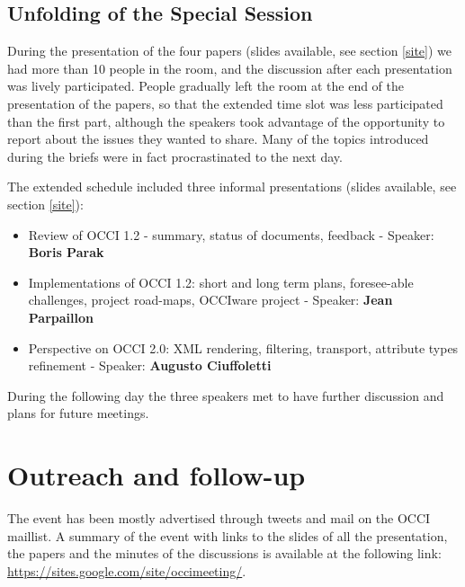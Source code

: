 \documentclass[10pt,a4paper]{article}
\begin{document}
\subsection{Unfolding of the Special Session}

During the presentation of the four papers (slides available, see section \ref{site}) we had more than 10 people in the room, and the discussion after each presentation was lively participated. People gradually left the room at the end of the presentation of the papers, so that the extended time slot was less participated than the first part, although the speakers took advantage of the opportunity to report about the issues they wanted to share. Many of the topics introduced during the briefs were in fact procrastinated to the next day.

The extended schedule included three informal presentations (slides available, see section \ref{site}):

\begin{itemize}
\item Review of OCCI 1.2 - summary, status of documents, feedback - Speaker: {\bf Boris Parak}
\item Implementations of OCCI 1.2: short and long term plans, foresee-able challenges, project road-maps, OCCIware project - Speaker: {\bf Jean Parpaillon}
\item Perspective on OCCI 2.0: XML rendering, filtering, transport, attribute types refinement - Speaker: {\bf Augusto Ciuffoletti}
\end{itemize}

During the following day the three speakers met to have further discussion and plans for future meetings.

\section{Outreach and follow-up \label{site}}

The event has been mostly advertised through tweets and mail on the OCCI maillist. A summary of the event with links to the slides of all the presentation, the papers and the minutes of the discussions is available at the following link:\\ \href{https://sites.google.com/site/occimeeting/}{https://sites.google.com/site/occimeeting/}.


\end{document}
